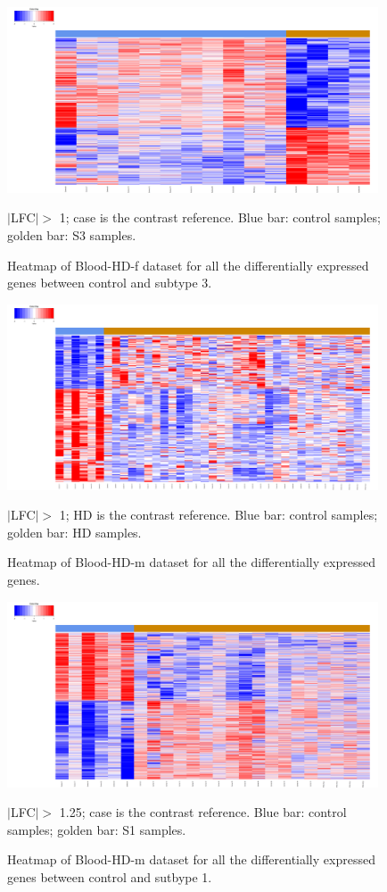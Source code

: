 \begin{figure}[!ht]
    \centerline{\includegraphics[width = 11cm]{Figures/DE heatmap/CTLvs3_HD-Blood-f_all.png}}
\caption{Heatmap of Blood-HD-f dataset for all the differentially expressed genes between control and subtype 3.}
\footnotesize $|$LFC$| >$ 1; case is the contrast reference. Blue bar: control samples; golden bar: S3 samples.
\end{figure}


\begin{figure}[!ht]
    \centerline{\includegraphics[width = 11cm]{Figures/DE heatmap/CTLvsHD-blood-m_all.png}}
\caption{Heatmap of Blood-HD-m dataset for all the differentially expressed genes.}
\label{DE-blood-hd-m}
\footnotesize $|$LFC$| >$ 1; HD is the contrast reference. Blue bar: control samples; golden bar: HD samples.
\end{figure}

\begin{figure}[!ht]
    \centerline{\includegraphics[width = 11cm]{Figures/DE heatmap/CTLvs1_HD-Blood-m_all.png}}
\caption{Heatmap of Blood-HD-m dataset for all the differentially expressed genes between control and sutbype 1.}
\footnotesize $|$LFC$| >$ 1.25; case is the contrast reference. Blue bar: control samples; golden bar: S1 samples.
\end{figure}

